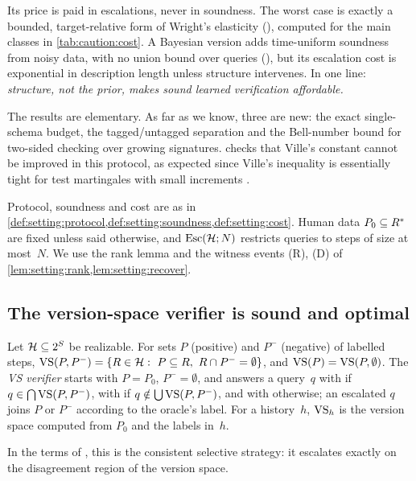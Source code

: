 Its price is paid in escalations, never in soundness. The worst case is exactly a bounded, target-relative form of Wright's elasticity (), computed for the main classes in \cref{tab:caution:cost}. A Bayesian version adds time-uniform soundness from noisy data, with no union bound over queries (), but its escalation cost is exponential in description length unless structure intervenes. In one line: \emph{structure, not the prior, makes sound learned verification affordable.}

The results are elementary. As far as we know, three are new: the exact single-schema budget, the tagged/untagged separation and the Bell-number bound for two-sided checking over growing signatures.  checks that Ville's constant cannot be improved in this protocol, as expected since Ville's inequality is essentially tight for test martingales with small increments \citep{ramdas2023game}.

Protocol, soundness and cost are as in \cref{def:setting:protocol,def:setting:soundness,def:setting:cost}. Human data $P_0\subseteq R^{*}$ are fixed unless said otherwise, and $\mathrm{Esc}(\mathcal{H};N)$ restricts queries to steps of size at most~$N$. We use the rank lemma and the witness events (R), (D) of \cref{lem:setting:rank,lem:setting:recover}.

\subsection{The version-space verifier is sound and optimal}\label{sec:caution:vs}

\begin{definition}\label{def:caution:vs}
Let $\mathcal{H}\subseteq2^S$ be realizable. For sets $P$ (positive) and $P^-$ (negative) of labelled steps, $\mathrm{VS}(P,P^-)=\{R\in\mathcal{H}:\ P\subseteq R,\ R\cap P^-=\emptyset\}$, and $\mathrm{VS}(P)=\mathrm{VS}(P,\emptyset)$. The \emph{VS verifier} starts with $P=P_0$, $P^-=\emptyset$, and answers a query~$q$ with \ACCEPT{} if $q\in\bigcap\mathrm{VS}(P,P^-)$, with \REJECT{} if $q\notin\bigcup\mathrm{VS}(P,P^-)$, and with \ESCALATE{} otherwise; an escalated $q$ joins $P$ or $P^-$ according to the oracle's label. For a history~$h$, $\mathrm{VS}_h$ is the version space computed from $P_0$ and the labels in~$h$.
\end{definition}

In the terms of \citet{elyaniv2010foundations}, this is the consistent selective strategy: it escalates exactly on the disagreement region of the version space.

